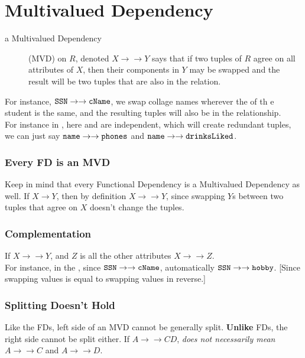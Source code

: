 \documentclass[11pt,a4paper,twocolumn]{book}
\begin{document}
\section{Multivalued Dependency}

\begin{description}
\item[a Multivalued Dependency] (MVD) on $R$, denoted $X \to \to Y$ says that if two tuples of $R$ agree on all attributes of $X$, then their components in $Y$ may be swapped and the result will be two tuples that are also in the relation.
\end{description}

\newcommand{\mvn}{\ensuremath{\to\to}}
For instance, $\C{SSN} \mvn \C{cName}$, we swap collage names wherever the  of th e student is the same, and the resulting tuples will also be in the relationship.\\

For instance in , here  and  are independent, which will create redundant tuples, we can just say $\C{name} \mvn \C{phones}$ and $\C {name} \mvn \C{drinksLiked}$.

\subsubsection{Every FD is an MVD}

Keep in mind that every Functional Dependency is a Multivalued Dependency as well. If $X \to Y$, then by definition $X \mvn Y$, since swapping $Y$s between two tuples that agree on $X$ doesn't change the tuples.

\subsubsection{Complementation}

If $X \mvn Y$, and $Z$ is all the other attributes $X \mvn Z$.\\

For instance, in the \ApplyExample, since $\C{SSN} \mvn \C{cName}$, automatically $\C{SSN} \mvn \C{hobby}$. [Since swapping  values is equal to swapping  values in reverse.]

\subsubsection{Splitting Doesn't Hold}

Like the FDs, left side of an MVD cannot be generally split. \textbf{Unlike} FDs, the right side cannot be split either. If $A \mvn CD$, \textit{does not necessarily mean} $A \mvn C$ and $A \mvn D$.
\end{document}
